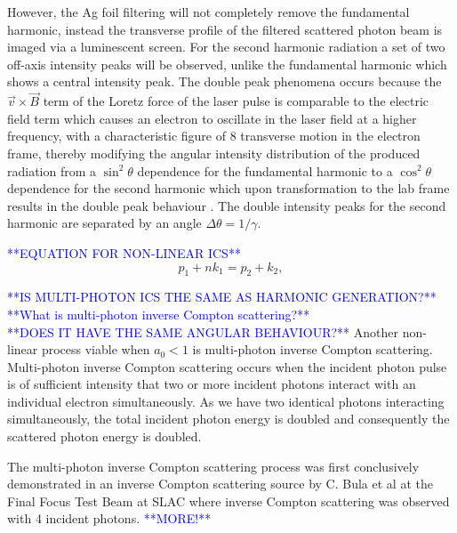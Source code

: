 \documentclass[../main.tex]{subfiles}
\begin{document}
However, the Ag foil filtering will not completely remove the fundamental harmonic, instead the transverse profile of the filtered scattered photon beam is imaged via a luminescent screen. For the second harmonic radiation a set of two off-axis intensity peaks will be observed, unlike the fundamental harmonic which shows a central intensity peak. The double peak phenomena occurs because the $\overrightarrow{v}\times\overrightarrow{B}$ term of the Loretz force of the laser pulse is comparable to the electric field term which causes an electron to oscillate in the laser field at a higher frequency, with a characteristic figure of 8 transverse motion \cite{sarachik1970classical,jackson1999classical} in the electron frame, thereby modifying the angular intensity distribution of the produced radiation from a $\sin^{2}\theta$ dependence for the fundamental harmonic to a $\cos^{2}\theta$ dependence for the second harmonic which upon transformation to the lab frame results in the double peak behaviour \cite{babzien2006observation}. The double intensity peaks for the second harmonic are separated by an angle $\Delta\theta = 1/\gamma$.   

\textcolor{blue}{**EQUATION FOR NON-LINEAR ICS**}
\begin{equation}
p_{1} + \mathit{n}k_{1} = p_{2} + k_{2},
\label{eq:nonlinear_electron_photon_interaction}    
\end{equation}

\textcolor{blue}{**IS MULTI-PHOTON ICS THE SAME AS HARMONIC GENERATION?**}
\textcolor{blue}{**What is multi-photon inverse Compton scattering?**\\ **DOES IT HAVE THE SAME ANGULAR BEHAVIOUR?**}
Another non-linear process viable when $a_{0} < 1$ is multi-photon inverse Compton scattering. Multi-photon inverse Compton scattering occurs when the incident photon pulse is of sufficient intensity that two or more incident photons interact with an individual electron simultaneously. As we have two identical photons interacting simultaneously, the total incident photon energy is doubled and consequently the scattered photon energy is doubled.

The multi-photon inverse Compton scattering process was first conclusively demonstrated in an inverse Compton scattering source by C. Bula et al \cite{bula1996observation} at the Final Focus Test Beam at SLAC \cite{burke1994results} where inverse Compton scattering was observed with 4 incident photons. \textcolor{blue}{**MORE!**}
\end{document}
